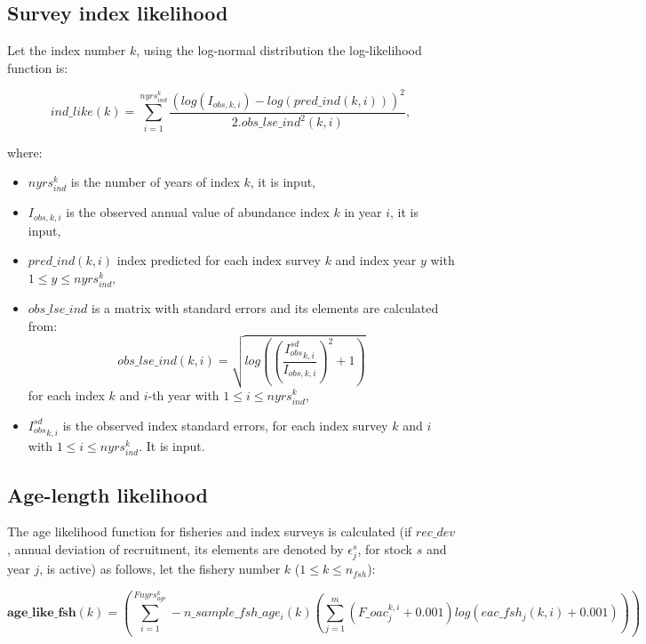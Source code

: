 \documentclass{article}
\begin{document}
\subsection{Survey index likelihood}
Let the index number $k$, using the log-normal distribution the log-likelihood function is:

\begin{equation} 
ind\_like(k)=\sum_{i=1}^{nyrs_{ind}^k}\dfrac{(log(I_{obs,k,i}) - log(pred\_ind(k,i)) )^2}{2.obs\_lse\_ind^2
    (k,i)},
\end{equation}

where:
\begin{itemize}
    \item $nyrs_{ind}^k$ is the number of years of index $k$, it is input,
    \item $I_{obs,k,i}$ is the observed annual value of abundance index $k$ in year $i$, it is input,
    \item $pred\_ind(k,i)$ index predicted for each index survey $k$ and index year $y$ with $1\leq y \leq nyrs_{ind}^k$,
    \item $obs\_lse\_ind$ is a matrix with standard errors and its elements are calculated from: $$obs\_lse\_ind(k,i)=\sqrt{log\left(\left(\dfrac{{I_{obs}^{sd}}_{k,i}}{I_{obs,k,i}}\right)^2+1\right)}$$ for each index $k$ and $i$-th year  with $1\leq i \leq nyrs_{ind}^k$,
    
    \item ${I_{obs}^{sd}}_{k,i}$ is the observed index standard errors, for each index survey $k$ and $i$ with $1\leq i \leq nyrs_{ind}^k$. It is input.
  
\end{itemize}

\subsection{Age-length likelihood}

The age likelihood function for fisheries and index surveys is calculated (if $rec\_dev$, annual deviation of recruitment, its elements are  denoted by $\epsilon^s_j$, for stock $s$ and year $j$, is active) as follows, let the fishery number $k$ ($1\leq k \leq n_{fsh}$):

\begin{equation}
\textbf{age\_like\_fsh}(k)=\left(\sum_{i=1}^{Fnyrs^k_{age}}-n\_sample\_fsh\_age_i(k)\left(\sum_{j=1}^{m}(F\_oac^{k,i}_j%
+0.001)log(eac\_fsh_j(k,i)+0.001)\right)\right)
\end{equation}
\end{document}

